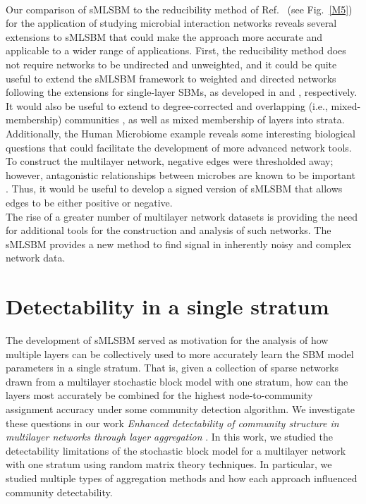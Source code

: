 %
\\\indent Our comparison of sMLSBM to the reducibility method of Ref.~\cite{domen} (see Fig.~\ref{M5}) for the application of studying microbial interaction networks reveals several extensions to sMLSBM that could make the approach more accurate and applicable to a wider range of applications. 
First, the reducibility method \cite{domen} does not require networks to be undirected and unweighted, and it could be quite useful to extend the sMLSBM framework to
weighted and directed networks following the extensions for single-layer SBMs, as developed in \cite{weightSBM} and \cite{sbmdirect}, respectively. 
It would also be useful to extend to degree-corrected and overlapping (i.e., mixed-membership) communities \cite{degreecorrectSBM}, as well as mixed membership of layers into strata.
%
%
Additionally, the Human Microbiome example reveals some interesting biological questions that could facilitate the development of more advanced network tools. To construct the multilayer network, negative edges were thresholded away; however, antagonistic relationships between microbes are known to be important \cite{antagonism}. Thus, it would be useful to develop a signed version of sMLSBM that allows edges to be either positive or negative. \\
\indent The rise of a greater number of multilayer network datasets is providing the need for additional tools for the construction and analysis of such networks. The sMLSBM provides a new method to find signal in inherently noisy and complex network data. 

\section{Detectability in a single stratum}

\noindent{}

The development of sMLSBM served as motivation for the analysis of how multiple layers can be collectively used to more accurately learn the SBM model parameters in a single stratum. That is, given a collection of sparse networks drawn from a multilayer stochastic block model with one stratum, how can the layers most accurately be combined for the highest node-to-community assignment accuracy under some community detection algorithm. We investigate these questions in our work \emph{Enhanced detectability of community structure in multilayer networks through layer aggregation} \cite{taylor2015enhanced}. In this work, we studied the detectability limitations of the stochastic block model for a multilayer network with one stratum using random matrix theory techniques. In particular, we studied multiple types of aggregation methods and how each approach influenced community detectability.

